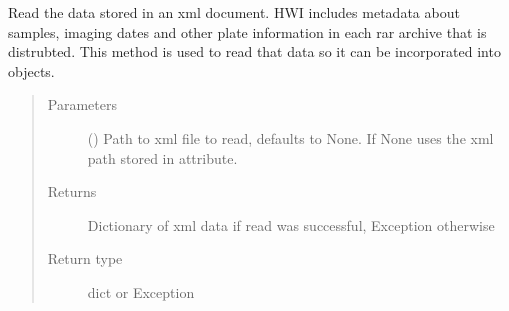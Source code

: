 \documentclass[letterpaper,10pt,english]{sphinxmanual}
\begin{document}
\begin{fulllineitems}

\begin{fulllineitems}
\label{\detokenize{polo.utils:polo.utils.io_utils.XmlReader.read_plate_data_xml}}
Read the data stored in an xml document. HWI includes metadata
about samples, imaging dates and other plate information in each
rar archive that is distrubted. This method is used to read that
data so it can be incorporated into  objects.
\begin{quote}\begin{description}
\item[{Parameters}] \leavevmode
{} (\sphinxstyleliteralemphasis{\sphinxupquote{, }}) \textendash{} Path to xml file to read, defaults to None.
If None uses the xml path stored in  attribute.

\item[{Returns}] \leavevmode
Dictionary of xml data if read was successful, Exception otherwise

\item[{Return type}] \leavevmode
dict or Exception

\end{description}\end{quote}

\end{fulllineitems}


\end{fulllineitems}

\end{document}
